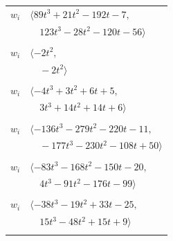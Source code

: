 \documentclass[11pt]{article}
\begin{document}
\begin{longtable}{@{}ll@{}}
$w_i$ & $\langle 89t^{3}+21t^{2}-192t-7,$\\
 & $\quad 123t^{3}-28t^{2}-120t-56\rangle$\\
\addlinespace[2pt]
\multicolumn{2}{@{}p{0.97\textwidth}@{}}{$i=29$, $D_i=1$, $\rho_{ij}$: $11{:}1, \allowbreak 57{:}1, \allowbreak 64{:}1$}\\
$w_i$ & $\langle -2t^{2},$\\
 & $\quad -2t^{2}\rangle$\\
\addlinespace[2pt]
\multicolumn{2}{@{}p{0.97\textwidth}@{}}{$i=30$, $D_i=2$, $\rho_{ij}$: $4{:}2, \allowbreak 5{:}1, \allowbreak 8{:}1, \allowbreak 17{:}1, \allowbreak 21{:}2, \allowbreak 50{:}1, \allowbreak 51{:}2$}\\
$w_i$ & $\langle -4t^{3}+3t^{2}+6t+5,$\\
 & $\quad 3t^{3}+14t^{2}+14t+6\rangle$\\
\addlinespace[2pt]
\multicolumn{2}{@{}p{0.97\textwidth}@{}}{$i=31$, $D_i=4$, $\rho_{ij}$: $14{:}2, \allowbreak 15{:}2, \allowbreak 23{:}2, \allowbreak 33{:}1, \allowbreak 37{:}2, \allowbreak 43{:}1, \allowbreak 46{:}1, \allowbreak 47{:}1, \allowbreak 50{:}2, \allowbreak 52{:}1, \allowbreak 56{:}2$}\\
$w_i$ & $\langle -136t^{3}-279t^{2}-220t-11,$\\
 & $\quad -177t^{3}-230t^{2}-108t+50\rangle$\\
\addlinespace[2pt]
\multicolumn{2}{@{}p{0.97\textwidth}@{}}{$i=32$, $D_i=8$, $\rho_{ij}$: $6{:}1, \allowbreak 14{:}1, \allowbreak 15{:}1, \allowbreak 18{:}1, \allowbreak 23{:}2, \allowbreak 44{:}1, \allowbreak 48{:}2, \allowbreak 55{:}2, \allowbreak 58{:}1, \allowbreak 59{:}1, \allowbreak 63{:}2$}\\
$w_i$ & $\langle -83t^{3}-168t^{2}-150t-20,$\\
 & $\quad 4t^{3}-91t^{2}-176t-99\rangle$\\
\addlinespace[2pt]
\multicolumn{2}{@{}p{0.97\textwidth}@{}}{$i=33$, $D_i=4$, $\rho_{ij}$: $5{:}2, \allowbreak 10{:}2, \allowbreak 14{:}1, \allowbreak 20{:}2, \allowbreak 31{:}2, \allowbreak 42{:}2, \allowbreak 55{:}1, \allowbreak 58{:}1, \allowbreak 64{:}1$}\\
$w_i$ & $\langle -38t^{3}-19t^{2}+33t-25,$\\
 & $\quad 15t^{3}-48t^{2}+15t+9\rangle$\\
\addlinespace[2pt]
\multicolumn{2}{@{}p{0.97\textwidth}@{}}{$i=34$, $D_i=2$, $\rho_{ij}$: $18{:}1, \allowbreak 27{:}1, \allowbreak 41{:}1, \allowbreak 65{:}1$}\\

\end{longtable}
\end{document}
